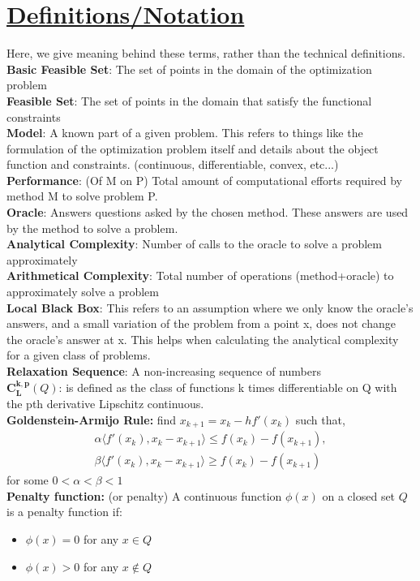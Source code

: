\documentclass[12pt,a4paper]{article}
\begin{document}
	\section*{\underline{Definitions/Notation}}\label{sec:Def}
	Here, we give meaning behind these terms, rather than the technical definitions.\\
	\textbf{Basic Feasible Set}: The set of points in the domain of the optimization problem\\
	\textbf{Feasible Set}: The set of points in the domain that satisfy the functional constraints\\
	\textbf{Model}: A known part of a given problem. This refers to things like the formulation of the optimization problem itself and details about the object function and constraints. (continuous, differentiable, convex, etc...)\\
	\textbf{Performance}: (Of M on P) Total amount of computational efforts required by method M to solve problem P.\\
	\textbf{Oracle}: Answers questions asked by the chosen method. These answers are used by the method to solve a problem. \\
	\textbf{Analytical Complexity}: Number of calls to the oracle to solve a problem approximately\\
	\textbf{Arithmetical Complexity}: Total number of operations (method+oracle) to approximately solve a problem\\
	\textbf{Local Black Box}: This refers to an assumption where we only know the oracle's answers, and a small variation of the problem from a point x, does not change the oracle's answer at x. This helps when calculating the analytical complexity for a given class of problems.\\
	\textbf{Relaxation Sequence}: A non-increasing sequence of numbers\\
	$\mathbf{C_L^{k,p}}(Q)$: is defined as the class of functions k times differentiable on Q with the pth derivative Lipschitz continuous. \\
	\textbf{Goldenstein-Armijo Rule:}
	find $x_{k+1} = x_k - hf'(x_k)$ such that, 
	\begin{align*}
		\alpha \langle f'(x_k), x_k - x_{k+1} \rangle \leq f(x_k) - f(x_{k+1}), \\
		\beta \langle f'(x_k), x_k - x_{k+1} \rangle \geq f(x_k) - f(x_{k+1})
	\end{align*} 
	for some $0<\alpha<\beta<1$\\
	
	\textbf{Penalty function:} (or penalty) A continuous function $\phi(x)$ on a closed set $Q$ is a penalty function if:
	\begin{itemize}
		\item $\phi(x) = 0$ for any $x \in Q$
		\item $\phi(x)>0$ for any $x \notin Q$
	\end{itemize}
	
\end{document}
